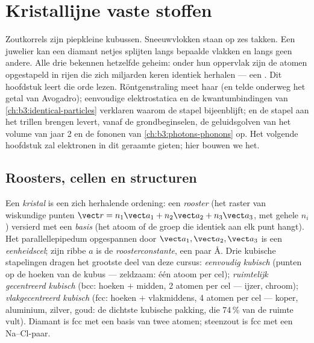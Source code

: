 \chapter{Kristallijne vaste stoffen}\label{ch:b3:crystalline-solids}


Zoutkorrels zijn piepkleine kubussen. Sneeuwvlokken staan op zes takken.
Een juwelier kan een diamant netjes splijten langs bepaalde vlakken en langs
geen andere. Alle drie bekennen hetzelfde geheim: onder hun oppervlak
zijn de atomen opgestapeld in rijen die zich miljarden keren identiek
herhalen --- een \emph{}. Dit hoofdstuk leert die
orde lezen. Röntgenstraling meet haar (en telde onderweg het getal van Avogadro);
eenvoudige elektrostatica en de kwantumbindingen van
\cref{ch:b3:identical-particles} verklaren waarom de stapel
bijeenblijft; en de stapel aan het trillen brengen levert, vanaf de
grondbeginselen, de geluidsgolven van het volume van jaar 2 en de fononen van
\cref{ch:b3:photons-phonons} op. Het volgende hoofdstuk zal elektronen
in dit geraamte gieten; hier bouwen we het.

\section{Roosters, cellen en structuren}

\begin{definition}\label{def:b3:crystalline-solids:lattice}
Een \emph{kristal} is een zich herhalende ordening: een \emph{rooster} (het
raster van wiskundige punten $\vect r = n_1\vect a_1 + n_2\vect a_2
+ n_3\vect a_3$, met gehele $n_i$) versierd met een \emph{basis} (het
atoom of de groep die identiek aan elk punt hangt). Het parallellepipedum
opgespannen door $\vect a_1, \vect a_2, \vect a_3$ is een \emph{eenheidscel};
zijn ribbe $a$ is de \emph{roosterconstante}, een paar
\unit{\angstrom}. Drie kubische stapelingen dragen het grootste deel van deze cursus:
\emph{eenvoudig kubisch} (punten op de hoeken van de kubus --- zeldzaam: één atoom per
cel); \emph{ruimtelijk gecentreerd kubisch} (bcc: hoeken $+$ midden, 2 atomen
per cel --- ijzer, chroom); \emph{vlakgecentreerd kubisch} (fcc:
hoeken $+$ vlakmiddens, 4 atomen per cel --- koper, aluminium,
zilver, goud: de dichtste kubische pakking, die 74\,\% van de ruimte vult).
Diamant is fcc met een basis van twee atomen; steenzout is fcc met een
Na--Cl-paar.
\end{definition}

